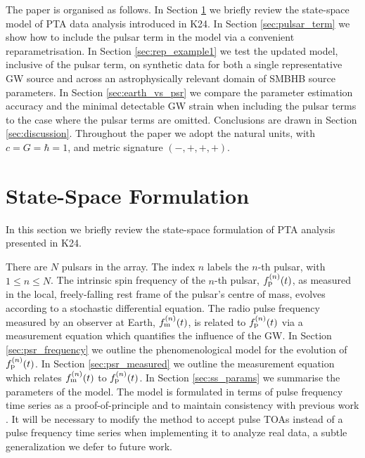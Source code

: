 \documentclass[fleqn,usenatbib,useAMS]{mnras}
\begin{document}
The paper is organised as follows. In Section \ref{sec:2} we briefly review the state-space model of PTA data analysis introduced in K24. In Section \ref{sec:pulsar_term} we show how to include the pulsar term in the model via a convenient reparametrisation. In Section \ref{sec:rep_example1} we test the updated model, inclusive of the pulsar term, on synthetic data for both a single representative GW source and across an astrophysically relevant domain of SMBHB source parameters. In Section \ref{sec:earth_vs_psr} we compare the parameter estimation accuracy and the minimal detectable GW strain when including the pulsar terms to the case where the pulsar terms are omitted. Conclusions are drawn in Section \ref{sec:discussion}. Throughout the paper we adopt the natural units, with $c = G = \hbar = 1$, and metric signature $(-,+,+,+)$. \newline 







\section{State-Space Formulation}\label{sec:2}
In this section we briefly review the state-space formulation of PTA analysis presented in K24. \newline 

There are $N$ pulsars in the array. The index $n$ labels the $n$-th pulsar, with $1\leq n\leq N$. The intrinsic spin frequency of the $n$-th pulsar, $f_{\rm p}^{(n)}(t)$, as measured in the local, freely-falling rest frame of the pulsar's centre of mass, evolves according to a stochastic differential equation. The radio pulse frequency measured by an observer at Earth, $f_{\rm m}^{(n)}(t)$, is related to $f_{\rm p}^{(n)}(t)$ via a measurement equation which quantifies the influence of the GW. In Section \ref{sec:psr_frequency} we outline the phenomenological model for the evolution of $f_{\rm p}^{(n)}(t)$. In Section \ref{sec:psr_measured} we outline the measurement equation which relates $f_{\rm m}^{(n)}(t)$ to $f_{\rm p}^{(n)}(t)$. In Section \ref{sec:ss_params} we summarise the parameters of the model. The model is formulated in terms of pulse frequency time series as a proof-of-principle and to maintain consistency with previous work \citep{Myers2021MNRAS.502.3113M,Meyers2021,KimpsonPTA}. It will be necessary to modify the method to accept pulse TOAs instead of a pulse frequency time series when implementing it to analyze real data, a subtle generalization we defer to future work. 
\end{document}
